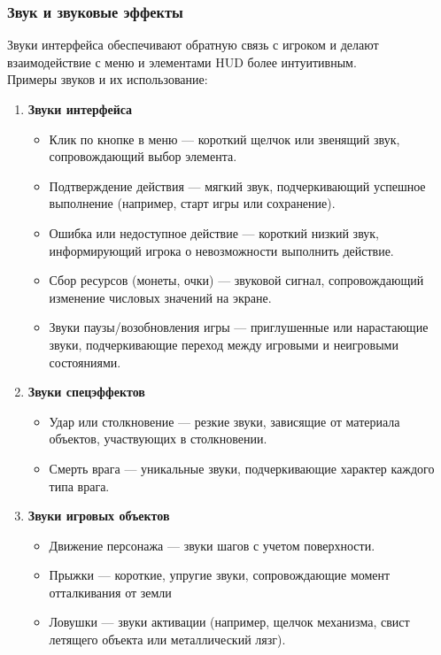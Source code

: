 \subsubsection{Звук и звуковые эффекты}
Звуки интерфейса обеспечивают обратную связь с игроком и делают взаимодействие с меню и элементами HUD более интуитивным. \\
Примеры звуков и их использование:
\begin{enumerate}
    \item \textbf{Звуки интерфейса}
    \begin{itemize}
        \item Клик по кнопке в меню — короткий щелчок или звенящий звук, сопровождающий выбор элемента.
        \item Подтверждение действия — мягкий звук, подчеркивающий успешное выполнение (например, старт игры или сохранение).
        \item Ошибка или недоступное действие — короткий низкий звук, информирующий игрока о невозможности выполнить действие.
        \item Сбор ресурсов (монеты, очки) — звуковой сигнал, сопровождающий изменение числовых значений на экране.
        \item Звуки паузы/возобновления игры — приглушенные или нарастающие звуки, подчеркивающие переход между игровыми и неигровыми состояниями.
    \end{itemize}
    \item \textbf{Звуки спецэффектов}
    \begin{itemize}
        \item Удар или столкновение — резкие звуки, зависящие от материала объектов, участвующих в столкновении.
        \item Смерть врага — уникальные звуки, подчеркивающие характер каждого типа врага.
    \end{itemize}
    \item \textbf{Звуки игровых объектов}
    \begin{itemize}
        \item Движение персонажа — звуки шагов с учетом поверхности.
        \item Прыжки — короткие, упругие звуки, сопровождающие момент отталкивания от земли
        \item Ловушки — звуки активации (например, щелчок механизма, свист летящего объекта или металлический лязг).
    \end{itemize}
\end{enumerate}